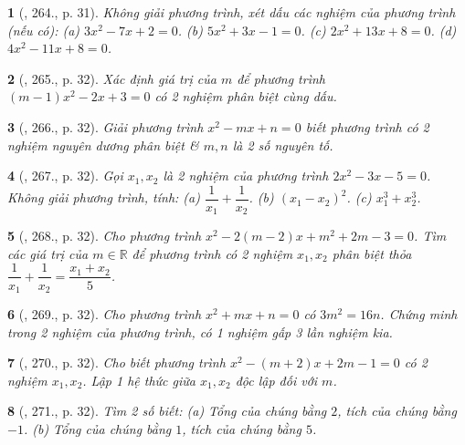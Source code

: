 \documentclass{article}
\newtheorem{baitoan}{}
\begin{document}
\begin{baitoan}[\cite{Binh_Toan_9_tap_2}, 264., p. 31]
	Không giải phương trình, xét dấu các nghiệm của phương trình (nếu có): (a) $3x^2 - 7x + 2 = 0$. (b) $5x^2 + 3x - 1 = 0$. (c) $2x^2 + 13x + 8 = 0$. (d) $4x^2 - 11x + 8 = 0$.
\end{baitoan}

\begin{baitoan}[\cite{Binh_Toan_9_tap_2}, 265., p. 32]
	Xác định giá trị của $m$ để phương trình $(m - 1)x^2 - 2x + 3 = 0$ có 2 nghiệm phân biệt cùng dấu.
\end{baitoan}

\begin{baitoan}[\cite{Binh_Toan_9_tap_2}, 266., p. 32]
	Giải phương trình $x^2 - mx + n = 0$ biết phương trình có 2 nghiệm nguyên dương phân biệt \& $m,n$ là 2 số nguyên tố.
\end{baitoan}

\begin{baitoan}[\cite{Binh_Toan_9_tap_2}, 267., p. 32]
	Gọi $x_1,x_2$ là 2 nghiệm của phương trình $2x^2 - 3x - 5 = 0$. Không giải phương trình, tính: (a) $\dfrac{1}{x_1} + \dfrac{1}{x_2}$. (b) $(x_1 - x_2)^2$. (c) $x_1^3 + x_2^3$.
\end{baitoan}

\begin{baitoan}[\cite{Binh_Toan_9_tap_2}, 268., p. 32]
	Cho phương trình $x^2 - 2(m - 2)x + m^2 + 2m - 3 = 0$. Tìm các giá trị của $m\in\mathbb{R}$ để phương trình có 2 nghiệm $x_1,x_2$ phân biệt thỏa $\dfrac{1}{x_1} + \dfrac{1}{x_2} = \dfrac{x_1 + x_2}{5}$.
\end{baitoan}

\begin{baitoan}[\cite{Binh_Toan_9_tap_2}, 269., p. 32]
	Cho phương trình $x^2 + mx + n = 0$ có $3m^2 = 16n$. Chứng minh trong 2 nghiệm của phương trình, có 1 nghiệm gấp 3 lần nghiệm kia.
\end{baitoan}

\begin{baitoan}[\cite{Binh_Toan_9_tap_2}, 270., p. 32]
	Cho biết phương trình $x^2 - (m + 2)x + 2m - 1 = 0$ có 2 nghiệm $x_1,x_2$. Lập 1 hệ thức giữa $x_1,x_2$ độc lập đối với $m$.
\end{baitoan}

\begin{baitoan}[\cite{Binh_Toan_9_tap_2}, 271., p. 32]
	Tìm 2 số biết: (a) Tổng của chúng bằng $2$, tích của chúng bằng $-1$. (b) Tổng của chúng bằng $1$, tích của chúng bằng $5$.
\end{baitoan}
\end{document}
